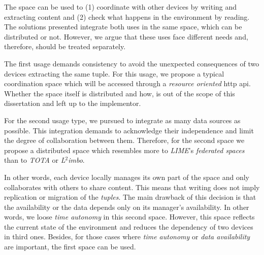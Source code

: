 The space can be used to
(1) coordinate with other devices by writing and extracting content and
(2) check what happens in the environment by reading.
The solutions presented integrate both uses in the same space, which can be distributed or not.
However, we argue that these uses face different needs and, therefore, should be treated separately.


The first usage demands consistency to avoid the unexpected consequences of two devices extracting the same tuple.
For this usage, we propose a typical coordination space which will be accessed through a \emph{resource oriented} \ac{http} \ac{api}.
Whether the space itself is distributed and how, is out of the scope of this dissertation and left up to the implementor.


For the second usage type, we pursued to integrate as many data sources as possible.
This integration demands to acknowledge their independence and limit the degree of collaboration between them.
Therefore, for the second space we propose a distributed space which resembles more to \emph{LIME}'s \emph{federated spaces} than to \emph{TOTA} or \emph{L$^2$imbo}.


In other words, each device locally manages its own part of the space and only collaborates with others to share content.
This means that writing does not imply replication or migration of the \emph{tuples}.
The main drawback of this decision is that the availability or the data depends only on its manager's availability.
In other words, we loose \emph{time autonomy} in this second space.
However, this space reflects the current state of the environment and reduces the dependency of two devices in third ones.
Besides, for those cases where \emph{time autonomy} or \emph{data availability} are important, the first space can be used.